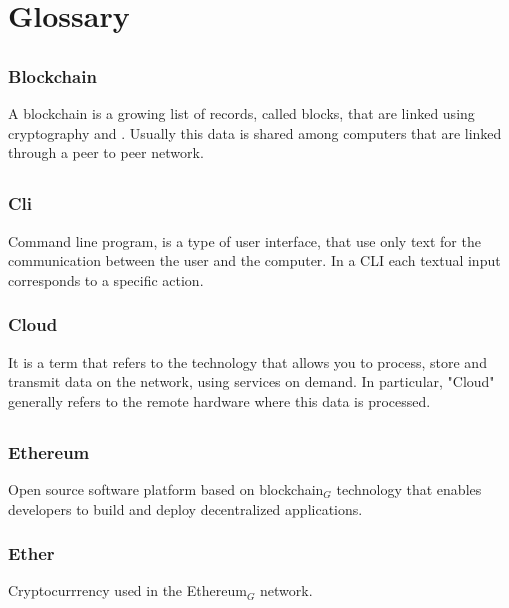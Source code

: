 \section{Glossary}

	\subsection*{}
		\subsubsection*{Blockchain}
			A blockchain is a growing list of records, called blocks, that are linked using cryptography and . Usually this data is shared among computers that are linked through a peer to peer network. 

	\subsection*{}
		\subsubsection*{Cli}
			Command line program, is a type of user interface, that use only text for the communication between the user and the computer. In a CLI each textual input corresponds to a specific action.		
		
		\subsubsection*{Cloud}
			It is a term that refers to the technology that allows you to process, store and transmit data on the network, using services on demand. In particular, "Cloud" generally refers to the remote hardware where this data is processed.

	\subsection*{}
		\subsubsection*{Ethereum}
			Open source software platform based on blockchain$_{G}$ technology that enables developers to build and deploy decentralized applications. 
			
		\subsubsection*{Ether}
			Cryptocurrrency used in the Ethereum$_{G}$ network. 
	
